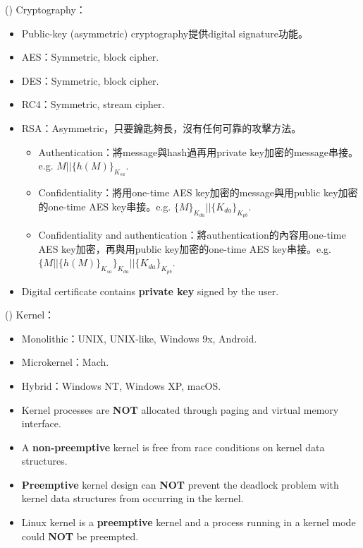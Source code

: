 \begin{theorem}{()} Cryptography： \begin{itemize}
        \item Public-key (asymmetric) cryptography提供digital signature功能。
        \item AES：Symmetric, block cipher.
        \item DES：Symmetric, block cipher.
        \item RC4：Symmetric, stream cipher.
        \item RSA：Asymmetric，只要鑰匙夠長，沒有任何可靠的攻擊方法。\begin{itemize}
            \item Authentication：將message與hash過再用private key加密的message串接。e.g. $M || \{h(M)\}_{K_{sa}}$.
            \item Confidentiality：將用one-time AES key加密的message與用public key加密的one-time AES key串接。e.g. $\{M\}_{K_{da}} || \{K_{da}\}_{K_{pb}}$.
            \item Confidentiality and authentication：將authentication的內容用one-time AES key加密，再與用public key加密的one-time AES key串接。e.g. $\{M || \{h(M)\}_{K_{sa}}\}_{K_{da}} || \{K_{da}\}_{K_{pb}}$.
        \end{itemize}
        \item Digital certificate contains \textbf{private key} signed by the user.
    \end{itemize}
\end{theorem}

\begin{theorem}{()} Kernel：\begin{itemize}
        \item Monolithic：UNIX, UNIX-like, Windows 9x, Android.
        \item Microkernel：Mach.
        \item Hybrid：Windows NT, Windows XP, macOS.
        \item Kernel processes are \textbf{NOT} allocated through paging and virtual memory interface.
        \item A \textbf{non-preemptive} kernel is free from race conditions on kernel data structures.
        \item \textbf{Preemptive} kernel design can \textbf{NOT} prevent the deadlock problem with kernel data structures from occurring in the kernel.
        \item Linux kernel is a \textbf{preemptive} kernel and a process running in a kernel mode could \textbf{NOT} be preempted.
    \end{itemize}
\end{theorem}

